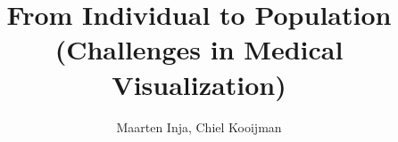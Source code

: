 \documentclass{beamer}
\title{From Individual to Population\\(Challenges in Medical Visualization)}
\author{Maarten Inja, Chiel Kooijman}
\begin{document}
\begin{frame}
	\maketitle
\end{frame}
\end{document}
